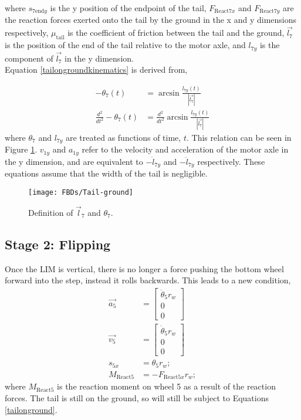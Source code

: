 where $s_{7\mathrm{end}y}$ is the y position of the endpoint of the tail, $F_{\mathrm{React}7x}$ and $F_{\mathrm{React}7y}$ are the reaction forces exerted onto the tail by the ground in the x and y dimensions respectively, $\mu_{\mathrm{tail}}$ is the coefficient of friction between the tail and the ground, $\vec{l_7}$ is the position of the end of the tail relative to the motor axle, and $l_{7y}$ is the component of $\vec{l_7}$ in the y dimension. \\
Equation \ref{tailongroundkinematics} is derived from,

\begin{subequations}
	\begin{align}
		-\theta_7(t) &= \arcsin{\frac{l_{7y}(t)}{|\vec{l_7}|}}\\
		\frac{d^2}{dt^2}-\theta_7(t) &= \frac{d^2}{dt^2}\arcsin{\frac{l_{7y}(t)}{|\vec{l_7}|}}
	\end{align}
\end{subequations}
where $\theta_7$ and $l_{7y}$ are treated as functions of time, $t$. This relation can be seen in Figure \ref{fig:tailGround}. $v_{1y}$ and $a_{1y}$ refer to the velocity and acceleration of the motor axle in the y dimension, and are equivalent to $-\dot{l}_{7y}$ and $-\ddot{l}_{7y}$ respectively. These equations assume that the width of the tail is negligible.\\

\begin{figure}[!h]
	\centering
	\texttt{[image: FBDs/Tail-ground]}
	\caption{Definition of $\vec{l}_7$ and $\theta_7$.}
	\label{fig:tailGround}
\end{figure}

\subsection*{Stage 2: Flipping}

Once the LIM is vertical, there is no longer a force pushing the bottom wheel forward into the step, instead it rolls backwards. This leads to a new condition,
\begin{subequations}
	\label{wheel1rolling}
	\begin{align}
		\vec{a_5} &= \begin{bmatrix}
			\ddot{\theta}_5 r_w \\
			0\\
			0
		\end{bmatrix}\\
		\vec{v_5} &= \begin{bmatrix}
			\dot{\theta}_5 r_w \\
			0\\
			0
		\end{bmatrix}\\
		s_{5x} &= \theta_{5} r_w;\\
		M_{\mathrm{React}5} &= - F_{\mathrm{React}5x} r_w;
	\end{align}
\end{subequations}
where $M_{\mathrm{React}5}$ is the reaction moment on wheel 5 as a result of the reaction forces.
The tail is still on the ground, so will still be subject to Equations \ref{tailonground}.

